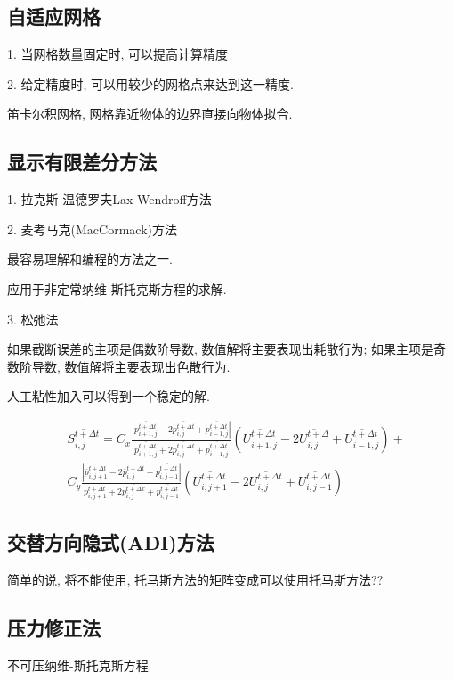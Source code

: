 \subsection{自适应网格}
1. 当网格数量固定时, 可以提高计算精度

2. 给定精度时, 可以用较少的网格点来达到这一精度.

笛卡尔积网格, 网格靠近物体的边界直接向物体拟合.


\subsection{显示有限差分方法}
1. 拉克斯-温德罗夫Lax-Wendroff方法

2. 麦考马克(MacCormack)方法

最容易理解和编程的方法之一.

应用于非定常纳维-斯托克斯方程的求解.

3. 松弛法

如果截断误差的主项是偶数阶导数, 数值解将主要表现出耗散行为; 如果主项是奇数阶导数, 数值解将主要表现出色散行为.

人工粘性加入可以得到一个稳定的解.



$$
	\begin{aligned}
		 & \overline{S_{i, j}^{t+\Delta t}}=C_{x} \frac{\left|\overline{p_{i+1, j}^{t+\Delta t}}-2 \overline{p_{i, j}^{t+\Delta t}}+\overline{p_{i-1, j}^{t+\Delta t}}\right|}{\overline{p_{i+1, j}^{t+\Delta t}}+2 \overline{p_{i, j}^{t+\Delta t}}+\overline{p_{i-1, j}^{t+\Delta t}}}\left(\overline{U_{i+1, j}^{t+\Delta t}}-2 \overline{U_{i, j}^{t+\Delta}}+\overline{U_{i-1, j}^{t+\Delta t}}\right)+ \\
		 & C_{y} \frac{\left|\bar{p}_{i, j+1}^{t+\Delta t}-2 \bar{p}_{i, j}^{t+\Delta t}+\overline{p_{i, j-1}^{t+\Delta t}}\right|}{p_{i, j+1}^{t+\Delta t}+2 \overline{p_{i, j}^{t+\Delta x}}+\overline{p_{i, j-1}^{t+\Delta t}}}\left(\overline{U_{i, j+1}^{t+\Delta t}}-2 \overline{U_{i, j}^{t+\Delta t}}+\overline{U_{i, j-1}^{t+\Delta t}}\right)
	\end{aligned}
$$
\subsection{交替方向隐式(ADI)方法}


简单的说, 将不能使用, 托马斯方法的矩阵变成可以使用托马斯方法??

\subsection{压力修正法}
不可压纳维-斯托克斯方程

